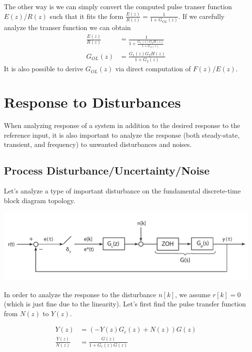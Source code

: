 \documentclass[twoside]{article}
\begin{document}
The other way is we can simply convert the computed pulse transer
function $E(z) / R(z)$ such that it fits the form $\frac{E(z)}{R(z)} = \frac{1}{1 + G_{OL}(z) }$.
If we carefully analyze the transer function we can obtain
%
\begin{align*}
\frac{E(z)}{R(z)} &= \frac{1}{1 + \frac{G_1(z) G_2H(z)}{1 + G_2(z)}} 
\\
G_{OL}(z) &= \frac{G_1(z) G_2H(z)}{1 + G_2(z)}
\end{align*}
%
It is also possible to derive $G_{OL}(z)$ via direct computation 
of $F(z) / E(z)$. 

\section*{Response to Disturbances}

When analyzing response of a system in addition to
the desired response to the reference input, it is also important
to analyze the response (both steady-state, transient, and frequency)
to unwanted disturbances and noises. 

\subsection*{Process Disturbance/Uncertainty/Noise}

Let's analyze a type of important disturbance on the fundamental 
discrete-time block diagram topology. 

\begin{center}
\begin{minipage}[h]{\linewidth}
    \begin{center}
      \includegraphics[width=\textwidth]{disturb}
    \end{center}
\end{minipage}
\end{center}

In order to analyze the response to the disturbance $n[k]$, we assume 
$r[k] = 0$ (which is just fine due to the linearity). Let's first find
the pulse transfer function from $N(z)$ to $Y(z)$. 

\begin{align*}
Y(z) &= ( -Y(z) G_c(z) + N(z) ) G(z)
\\
\frac{Y(z)}{N(z)} &= \frac{G(z)}{1 + G_c(z) G(z)}
\end{align*}
\end{document}
